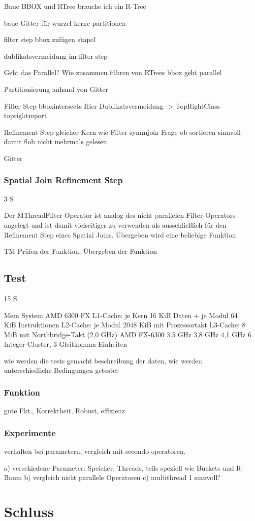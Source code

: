 \documentclass[a4paper,12pt,twoside]{article}
\begin{document}
Baue BBOX und RTree
brauche ich ein R-Tree

baue Gitter für wurzel kerne partitionen

filter step bbox zufügen stapel

dublikatsvermeidung im filter step

Geht das Parallel? Wie zusammen führen von RTrees
bbox geht parallel

Partitionierung
anhand von Gitter

Filter-Step
bboxintersects
Hier Dublikatsvermeidung -> TopRightClass
toprightreport

Refinement Step gleicher Kern wie Filter
symmjoin
Frage ob sortieren sinnvoll damit flob nicht mehrmals gelesen

Gitter

\subsubsection{Spatial Join Refinement Step} 3 S

Der MThreadFilter-Operator ist analog des nicht parallelen Filter-Operators angelegt und ist damit vielseitiger zu verwenden als ausschließlich für den Refinement Step eines Spatial Joins. Übergeben wird eine beliebige Funktion

TM Prüfen der Funktion, Übergeben der Funktion

\subsection{Test} 15 S

Mein System AMD 6300 FX
L1-Cache: je Kern 16 KiB Daten + je Modul 64 KiB Instruktionen
L2-Cache: je Modul 2048 KiB mit Prozessortakt
L3-Cache: 8 MiB mit Northbridge-Takt (2,0 GHz)
AMD FX-6300 	3,5 GHz 	3,8 GHz 	4,1 GHz
6 Integer-Cluster, 3 Gleitkomma-Einheiten

wie werden die tests gemacht
beschreibung der daten, wie werden unterschiedliche Bedingungen getestet

\subsubsection{Funktion}
gute Fkt., Korrektheit, Robust, effizienz


\subsubsection{Experimente}
verhalten bei parametern, vergleich mit secondo operatoren.

a) verschiedene Parameter: Speicher, Threads, teils speziell wie Buckets und R-Baum 
b) vergleich nicht parallele Operatoren
c) multithread 1 sinnvoll?

\section{Schluss}

\pagebreak 
\printbibliography
\end{document}
